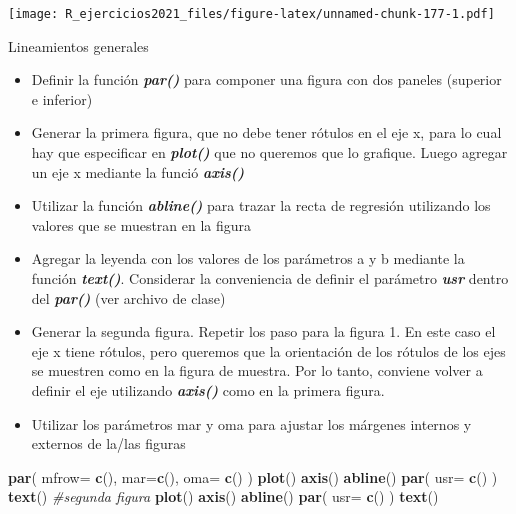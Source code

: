 \documentclass[]{book}
\newenvironment{Shaded}{\begin{snugshade}}{\end{snugshade}}
\newcommand{\CommentTok}[1]{\textcolor[rgb]{0.56,0.35,0.01}{\textit{#1}}}
\newcommand{\DataTypeTok}[1]{\textcolor[rgb]{0.13,0.29,0.53}{#1}}
\newcommand{\KeywordTok}[1]{\textcolor[rgb]{0.13,0.29,0.53}{\textbf{#1}}}
\newcommand{\NormalTok}[1]{#1}
\providecommand{\tightlist}{%
  \setlength{\itemsep}{0pt}\setlength{\parskip}{0pt}}
\begin{document}
\texttt{[image: R\_ejercicios2021\_files/figure-latex/unnamed-chunk-177-1.pdf]}

Lineamientos generales

\begin{itemize}
\tightlist
\item
  Definir la función \emph{\textbf{par()}} para componer una figura con dos paneles (superior e inferior)\\
\item
  Generar la primera figura, que no debe tener rótulos en el eje x, para lo cual hay que especificar en \emph{\textbf{plot()}} que no queremos que lo grafique. Luego agregar un eje x mediante la funció \emph{\textbf{axis()}}
\item
  Utilizar la función \emph{\textbf{abline()}} para trazar la recta de regresión utilizando los valores que se muestran en la figura\\
\item
  Agregar la leyenda con los valores de los parámetros a y b mediante la función \emph{\textbf{text()}}. Considerar la conveniencia de definir el parámetro \emph{\textbf{usr}} dentro del \emph{\textbf{par()}} (ver archivo de clase)\\
\item
  Generar la segunda figura. Repetir los paso para la figura 1. En este caso el eje x tiene rótulos, pero queremos que la orientación de los rótulos de los ejes se muestren como en la figura de muestra. Por lo tanto, conviene volver a definir el eje utilizando \emph{\textbf{axis()}} como en la primera figura.\\
\item
  Utilizar los parámetros mar y oma para ajustar los márgenes internos y externos de la/las figuras
\end{itemize}

\begin{Shaded}
\begin{Highlighting}[]
\KeywordTok{par}\NormalTok{( }\DataTypeTok{mfrow=} \KeywordTok{c}\NormalTok{(), }\DataTypeTok{mar=}\KeywordTok{c}\NormalTok{(), }\DataTypeTok{oma=} \KeywordTok{c}\NormalTok{() )}
\KeywordTok{plot}\NormalTok{()}
\KeywordTok{axis}\NormalTok{()}
\KeywordTok{abline}\NormalTok{()}
\KeywordTok{par}\NormalTok{( }\DataTypeTok{usr=} \KeywordTok{c}\NormalTok{() )}
\KeywordTok{text}\NormalTok{()}
\CommentTok{#segunda figura}
\KeywordTok{plot}\NormalTok{()}
\KeywordTok{axis}\NormalTok{()}
\KeywordTok{abline}\NormalTok{()}
\KeywordTok{par}\NormalTok{( }\DataTypeTok{usr=} \KeywordTok{c}\NormalTok{() )}
\KeywordTok{text}\NormalTok{()}
\end{Highlighting}
\end{Shaded}
\end{document}
